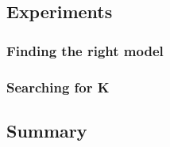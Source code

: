 \subsection{Experiments} 

\subsubsection{Finding the right model}

\subsubsection{Searching for K}

\subsection{Summary}